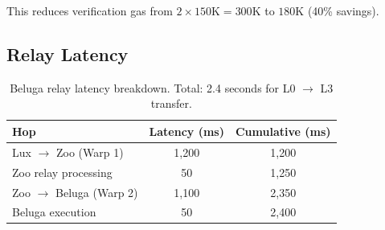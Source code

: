 This reduces verification gas from $2 \times 150\text{K} = 300\text{K}$ to $180\text{K}$ (40\% savings).

\subsection{Relay Latency}

\begin{table}[t]
\centering
\begin{tabular}{lcc}
\toprule
\textbf{Hop} & \textbf{Latency (ms)} & \textbf{Cumulative (ms)} \\
\midrule
Lux $\to$ Zoo (Warp 1) & 1,200 & 1,200 \\
Zoo relay processing & 50 & 1,250 \\
Zoo $\to$ Beluga (Warp 2) & 1,100 & 2,350 \\
Beluga execution & 50 & 2,400 \\
\bottomrule
\end{tabular}
\caption{Beluga relay latency breakdown. Total: 2.4 seconds for L0 $\to$ L3 transfer.}
\label{tab:relay}
\end{table}

